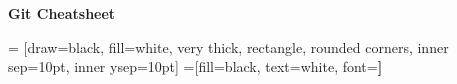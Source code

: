\documentclass[a4paper]{article}
\begin{document}
\begin{center}
	\textcolor{lightpurple}{
		\textbf{{Git Cheatsheet}}\\
	}
	\vspace{-3mm}
\end{center}



\footnotesize
\begin{multicols*}{3}

 = [draw=black, fill=white, very thick,
    rectangle, rounded corners, inner sep=10pt, inner ysep=10pt]
 =[fill=black, text=white, font=\bfseries]


\vspace{-2mm}

\vspace{-2mm}

\vspace{-3mm}

\vspace{-1mm}

\vspace{-2mm}

\vspace{-2mm}

\vspace{-2mm}

\vspace{-2mm}


\end{multicols*}
\end{document}
